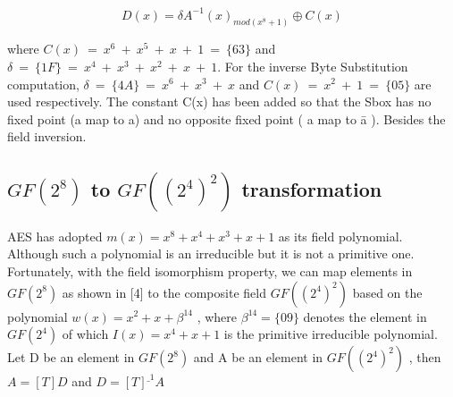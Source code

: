\documentclass[10pt, conference, compsocconf]{IEEEtran}
\begin{document}
\begin{equation}
D(x) = \delta  A^{-1} (x)_{mod (x^8 + 1)} \oplus C(x)
\end{equation}


where $C(x)~=~x^6~+~x^5~+~x~+~1~=~\{63\}$ and $\delta~=~\{1F\}~=~x^4~+~x^3~+~x^2~+~x~+~1$. For the inverse Byte Substitution computation, $\delta~=~\{4A\}~=~x^6~+~x^3~+~x$ and $C(x)~=~x^2~+~1~=~\{05\}$ are used respectively. The constant C(x) has been added so that the Sbox has no fixed point (a map to a) and no opposite fixed point ( a map to \={a} ). Besides the field inversion. 



\subsection{$GF(2^8)$ to $GF((2^4)^2)$ transformation\cite{springerRudra}\cite{1149067}}
   AES has adopted $m(x) = x^8 +x^4 +x^3 +x+1$ as its field polynomial. Although such a polynomial is an irreducible but it is not a primitive one. Fortunately, with the field isomorphism property, we can map elements in $GF(2^8)$ as shown in [4] to the composite field $GF((2^4)^2)$ based on the polynomial $w(x)=x^2+x+ \beta ^{14}$ , where $\beta ^{14}=\{09\}$ denotes the element in $GF(2^4)$ of which $I(x) = x^4 + x + 1$ is the primitive irreducible polynomial. Let D be an element in $GF(2^8)$ and A be an element in $GF((2^4)^2)$ , then $A = [T] D$ and $D = [T]^{\_ 1} A$
   
\end{document}

